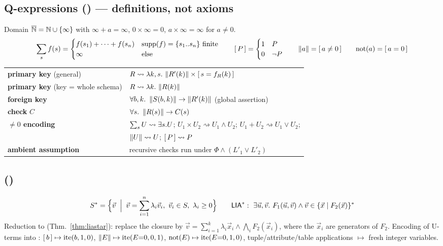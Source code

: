 \subsection*{Q-expressions (\QED{}) --- definitions, not axioms}

\noindent Domain $\overline{\mathbb{N}}=\mathbb{N}\cup\{\infty\}$ with
$\infty+a=\infty$, $0\times\infty=0$, $a\times\infty=\infty$ for $a\neq0$.
\[
\sum_{s}f(s)=\begin{cases}f(s_1)+\cdots+f(s_n)&\mathrm{supp}(f)=\{s_1..s_n\}\text{ finite}\\ \infty&\text{else}\end{cases}
\qquad
[\,P\,]=\begin{cases}1&P\\0&\neg P\end{cases}
\qquad
\left\lVert a \right\rVert=[\,a\neq0\,]
\qquad
\mathrm{not}(a)=[\,a=0\,]
\]

\begin{center}
\begin{tabular}{@{}ll@{}}
\toprule
\textbf{primary key} (general) & $R\rightsquigarrow\lambda k,s.\,\left\lVert R'(k) \right\rVert\times[\,s=f_R(k)\,]$\\
\textbf{primary key} (key = whole schema) & $R\rightsquigarrow\lambda k.\,\left\lVert R(k) \right\rVert$\\
\textbf{foreign key} & $\forall b,k.\ \sq{S(b,k)}\to\sq{R'(k)}$ (global assertion)\\
\textbf{check} $C$ & $\forall s.\ \sq{R(s)}\to C(s)$\\
\midrule
\textbf{$\neq0$ encoding} & $\sum_{s}U\rightsquigarrow\exists s.U$; \;
$U_1{\times}U_2\rightsquigarrow U_1\wedge U_2$; \;
$U_1{+}U_2\rightsquigarrow U_1\vee U_2$;\\
& $\left\lVert U \right\rVert\rightsquigarrow U$; \; $[\,P\,]\rightsquigarrow P$\\
\midrule
\textbf{ambient assumption} & recursive checks run under $\Phi\wedge(L'_1\vee L'_2)$\\
\bottomrule
\end{tabular}
\end{center}

\subsection*{\liastar{} (\sqlsolver{})}

\[
S^*=\Bigl\{\vec v \;\Bigm|\; \vec v=\sum_{i=1}^{n}\lambda_i\vec v_i,\ \vec v_i\in S,\ \lambda_i\ge0\Bigr\}
\qquad
\textsf{LIA}^*{}:\ \exists\vec u,\vec v.\ F_1(\vec u,\vec v)\wedge\vec v\in\{\vec x\mid F_2(\vec x)\}^*
\]
Reduction to \lia{} (Thm.~\ref{thm:liastar}): replace the closure by
$\vec v=\sum_{i=1}^{k}\lambda_i\vec x_i\wedge\bigwedge_i F_2(\vec x_i)$, where the $\vec x_i$
are generators of $F_2$. Encoding of U-terms into \lia{}:
$[\,b\,]\mapsto\mathrm{ite}(b,1,0)$, $\left\lVert E \right\rVert\mapsto\mathrm{ite}(E{=}0,0,1)$,
$\mathrm{not}(E)\mapsto\mathrm{ite}(E{=}0,1,0)$, tuple/attribute/table applications $\mapsto$ fresh
integer variables.

